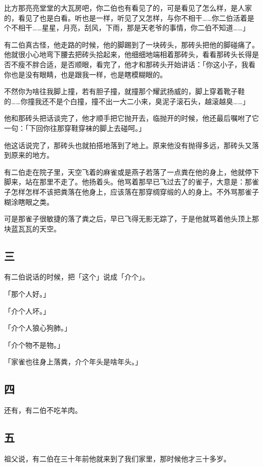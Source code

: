 \documentclass[UTF8]{ctexart}
\begin{document}
比方那亮亮堂堂的大瓦房吧，你二伯也有看见了的，可是看见了怎么样，是人家的，看见了也是白看。听也是一样，听见了又怎样，与你不相干……你二伯活着是个不相干……星星，月亮，刮风，下雨，那是天老爷的事情，你二伯不知道……」

有二伯真古怪，他走路的时候，他的脚踢到了一块砖头，那砖头把他的脚碰痛了。他就很小心地弯下腰去把砖头拾起来，他细细地端相着那砖头，看看那砖头长得是否不瘦不胖合适，是否顺眼，看完了，他才和那砖头开始讲话：「你这小子，我看你也是没有眼睛，也是跟我一样，也是瞎模糊眼的。

不然你为啥往我脚上撞，若有胆子撞，就撞那个耀武扬威的，脚上穿着靴子鞋的……你撞我还不是个白撞，撞不出一大二小来，臭泥子滚石头，越滚越臭……」

他和那砖头把话谈完了，他才顺手把它抛开去，临抛开的时候，他还最后嘱咐了它一句：「下回你往那穿鞋穿袜的脚上去碰呵。」

他这话说完了，那砖头也就拍搭地落到了地上。原来他没有抛得多远，那砖头又落到原来的地方。

有二伯走在院子里，天空飞着的麻雀或是燕子若落了一点粪在他的身上，他就停下脚来，站在那里不走了。他扬着头。他骂着那早已飞过去了的雀子，大意是：那雀子怎样怎样不该把粪落在他身上，应该落在那穿绸穿缎的人的身上。不外骂那雀子糊涂瞎眼之类。

可是那雀子很敏捷的落了粪之后，早已飞得无影无踪了，于是他就骂着他头顶上那块蓝瓦瓦的天空。

\subsection{三}

有二伯说话的时候，把「这个」说成「介个」。

「那个人好。」

「介个人坏。」

「介个人狼心狗肺。」

「介个物不是物。」

「家雀也往身上落粪，介个年头是啥年头。」

\subsection{四}

还有，有二伯不吃羊肉。

\subsection{五}

祖父说，有二伯在三十年前他就来到了我们家里，那时候他才三十多岁。
\end{document}
